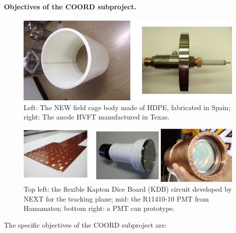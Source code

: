 \paragraph{Objectives of the COORD subproject.}

\begin{figure}[t!b!]
\begin{center}
\includegraphics[width=.9\textwidth]{img/FC3.jpg}
\end{center}
\caption{Left: The NEW field cage body made of HDPE, fabricated in Spain; right: The anode HVFT manufactured in Texas.
} \label{fig:FC}
\end{figure}

\begin{figure}[t!b!]
\begin{center}
\includegraphics[width=.9\textwidth]{img/KDBandPMT.jpg}
\end{center}
\caption{Top left: the flexible Kapton Dice Board (KDB) circuit developed by NEXT for the tracking plane; mid: the R11410-10 PMT from Hamamatsu; bottom right: a PMT can prototype.} \label{fig:sensors}
\end{figure}

The specific objectives of the COORD subproject are:

